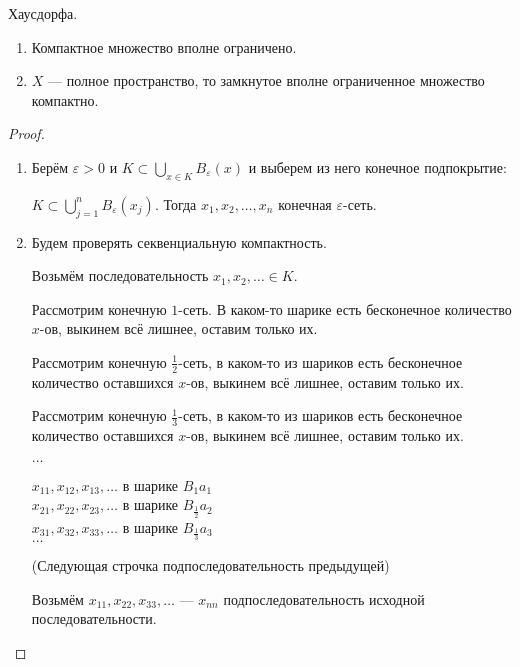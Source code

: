 \begin{theorem-non}
    Хаусдорфа.

    \begin{enumerate}
        \item Компактное множество вполне ограничено.
        \item $X$ --- полное пространство, то замкнутое вполне ограниченное множество компактно.
    \end{enumerate}

    \begin{proof}
        \begin{enumerate}
            \item Берём $\varepsilon > 0$  и $K \subset \bigcup_{x \in K}B_{\varepsilon}(x)$ и выберем из него конечное подпокрытие:
            
            $K \subset \bigcup_{j = 1}^n B_{\varepsilon}(x_j)$. Тогда $x_1, x_2, \dots, x_n$ конечная $\varepsilon$-сеть.

            \item 
            Будем проверять секвенциальную компактность.
            
            Возьмём последовательность $x_1, x_2, \dots \in K$.

            Рассмотрим конечную $1$-сеть.
            В каком-то шарике есть бесконечное количество $x$-ов, выкинем всё лишнее, оставим только их.
            
            Рассмотрим конечную $\frac{1}{2}$-сеть, в каком-то из шариков есть бесконечное количество оставшихся $x$-ов, выкинем всё лишнее, оставим только их.

            Рассмотрим конечную $\frac{1}{3}$-сеть, в каком-то из шариков есть бесконечное количество оставшихся $x$-ов, выкинем всё лишнее, оставим только их.

            $\dots$

            $x_{11}, x_{12}, x_{13}, \dots $ в шарике $B_1{a_1}$ \\
            $x_{21}, x_{22}, x_{23}, \dots $ в шарике $B_{\frac{1}{2}}{a_2}$ \\
            $x_{31}, x_{32}, x_{33}, \dots $ в шарике $B_{\frac{1}{3}}{a_3}$  \\
            $\dots$

            (Следующая строчка подпоследовательность предыдущей)

            Возьмём $x_{11}, x_{22}, x_{33}, \dots$ --- $x_{nn}$ подпоследовательность исходной последовательности.


\end{enumerate}
\end{proof}
\end{theorem-non}
